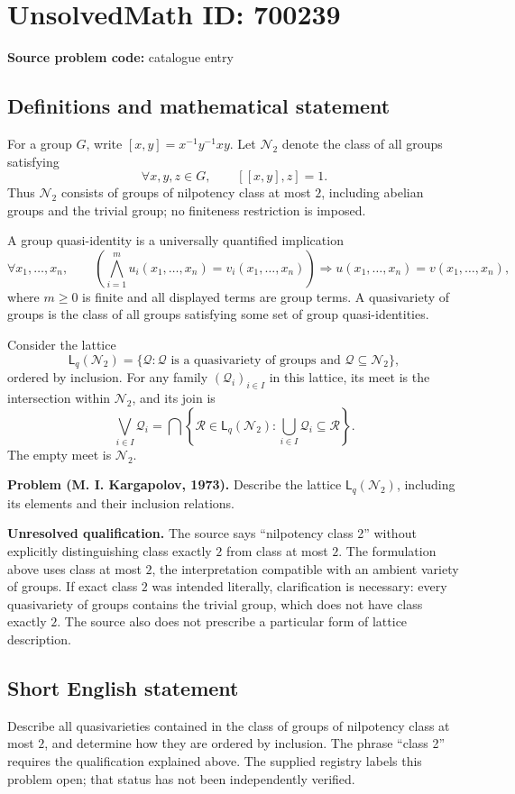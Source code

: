 \documentclass[11pt]{article}
\begin{document}
\section*{UnsolvedMath ID: 700239}
\textbf{Source problem code:} catalogue entry
\subsection{Definitions and mathematical statement}
For a group \(G\), write \([x,y]=x^{-1}y^{-1}xy\). Let \(\mathcal N_2\) denote the class of all groups satisfying
\[
\forall x,y,z\in G,\qquad [[x,y],z]=1.
\]
Thus \(\mathcal N_2\) consists of groups of nilpotency class at most \(2\), including abelian groups and the trivial group; no finiteness restriction is imposed.

A group quasi-identity is a universally quantified implication
\[
\forall x_1,\ldots,x_n,\qquad
\left(\bigwedge_{i=1}^{m}u_i(x_1,\ldots,x_n)=v_i(x_1,\ldots,x_n)\right)
\Longrightarrow u(x_1,\ldots,x_n)=v(x_1,\ldots,x_n),
\]
where \(m\geq 0\) is finite and all displayed terms are group terms. A quasivariety of groups is the class of all groups satisfying some set of group quasi-identities.

Consider the lattice
\[
\mathsf L_q(\mathcal N_2)
=\{\mathcal Q:\mathcal Q\text{ is a quasivariety of groups and }\mathcal Q\subseteq\mathcal N_2\},
\]
ordered by inclusion. For any family \((\mathcal Q_i)_{i\in I}\) in this lattice, its meet is the intersection within \(\mathcal N_2\), and its join is
\[
\bigvee_{i\in I}\mathcal Q_i
=\bigcap\left\{\mathcal R\in\mathsf L_q(\mathcal N_2):
\bigcup_{i\in I}\mathcal Q_i\subseteq\mathcal R\right\}.
\]
The empty meet is \(\mathcal N_2\).

\textbf{Problem (M. I. Kargapolov, 1973).} Describe the lattice \(\mathsf L_q(\mathcal N_2)\), including its elements and their inclusion relations.

\textbf{Unresolved qualification.} The source says ``nilpotency class 2'' without explicitly distinguishing class exactly \(2\) from class at most \(2\). The formulation above uses class at most \(2\), the interpretation compatible with an ambient variety of groups. If exact class \(2\) was intended literally, clarification is necessary: every quasivariety of groups contains the trivial group, which does not have class exactly \(2\). The source also does not prescribe a particular form of lattice description.
\subsection{Short English statement}
Describe all quasivarieties contained in the class of groups of nilpotency class at most \(2\), and determine how they are ordered by inclusion. The phrase ``class 2'' requires the qualification explained above. The supplied registry labels this problem open; that status has not been independently verified.
\end{document}
